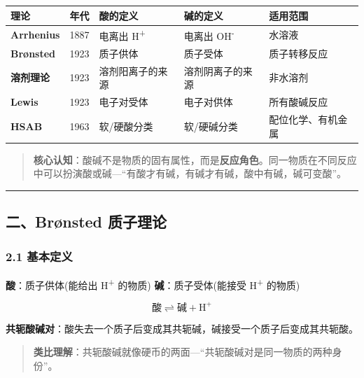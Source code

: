 \documentclass[a4paper,11pt]{ctexart}
\newcounter{none}
\newcommand{\箭}{\ensuremath{\rightarrow}}
\newcommand{\左箭}{\ensuremath{\leftarrow}}
\newcommand{\上箭}{\ensuremath{\uparrow}}
\newcommand{\下箭}{\ensuremath{\downarrow}}
\newcommand{\衡}{\ensuremath{\rightleftharpoons}}
\newcommand{\双箭}{\ensuremath{\leftrightarrow}}
\newcommand{\约等于}{\ensuremath{\approx}}
\newcommand{\小于等于}{\ensuremath{\leq}}
\newcommand{\大于等于}{\ensuremath{\geq}}
\newcommand{\不等于}{\ensuremath{\neq}}
\newcommand{\西格马}{\ensuremath{\sigma}}
\newcommand{\派}{\ensuremath{\pi}}
\begin{document}
{\def\LTcaptype{none} %
\begin{longtable}[]{@{}lclll@{}}
\toprule\noalign{}
理论 & 年代 & 酸的定义 & 碱的定义 & 适用范围 \\
\midrule\noalign{}
\endhead
\bottomrule\noalign{}
\endlastfoot
\textbf{Arrhenius} & 1887 & 电离出 H\textsuperscript{+} & 电离出 OH\textsuperscript{-} & 水溶液 \\
\textbf{Brønsted} & 1923 & 质子供体 & 质子受体 & 质子转移反应 \\
\textbf{溶剂理论} & 1923 & 溶剂阳离子的来源 & 溶剂阴离子的来源 & 非水溶剂 \\
\textbf{Lewis} & 1923 & 电子对受体 & 电子对供体 & 所有酸碱反应 \\
\textbf{HSAB} & 1963 & 软/硬酸分类 & 软/硬碱分类 & 配位化学、有机金属 \\
\end{longtable}
}

\begin{quote}
\textbf{核心认知}：酸碱不是物质的固有属性，而是\textbf{反应角色}。同一物质在不同反应中可以扮演酸或碱---``有酸才有碱，有碱才有碱，酸中有碱，碱可变酸''。
\end{quote}

\begin{center}\rule{0.5\linewidth}{0.5pt}\end{center}

\subsection{二、Brønsted 质子理论}\label{ux4e8cbruxf8nsted-ux8d28ux5b50ux7406ux8bba}

\subsubsection{2.1 基本定义}\label{ux57faux672cux5b9aux4e49}

\textbf{酸}：质子供体(能给出 H\textsuperscript{+} 的物质)
\textbf{碱}：质子受体(能接受 H\textsuperscript{+} 的物质)

\[
\text{酸} \rightleftharpoons \text{碱} + \mathrm{H}^+
\]

\textbf{共轭酸碱对}：酸失去一个质子后变成其共轭碱，碱接受一个质子后变成其共轭酸。

\begin{quote}
\textbf{类比理解}：共轭酸碱就像硬币的两面---``共轭酸碱对是同一物质的两种身份''。
\end{quote}
\end{document}
